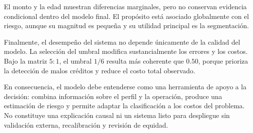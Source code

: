 El monto y la edad muestran diferencias marginales, pero no conservan
evidencia condicional dentro del modelo final. El propósito está asociado
globalmente con el riesgo, aunque su magnitud es pequeña y su utilidad
principal es la segmentación.

Finalmente, el desempeño del sistema no depende únicamente de la calidad
del modelo. La selección del umbral modifica sustancialmente los errores
y los costos. Bajo la matriz \(5:1\), el umbral \(1/6\) resulta más
coherente que \(0.50\), porque prioriza la detección de malos créditos y
reduce el costo total observado.

En consecuencia, el modelo debe entenderse como una herramienta de apoyo
a la decisión: combina información sobre el perfil y la operación,
produce una estimación de riesgo y permite adaptar la clasificación a los
costos del problema. No constituye una explicación causal ni un sistema
listo para despliegue sin validación externa, recalibración y revisión de
equidad.

